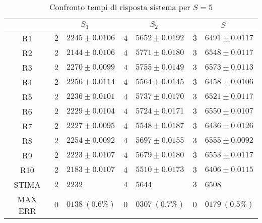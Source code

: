 \begin{table}[!h]
\begin{tabular}{c|r@{.}l|r@{.}l|r@{.}l}
& \multicolumn{2}{|c|}{$S_1$}
& \multicolumn{2}{|c|}{$S_2$}
& \multicolumn{2}{|c}{$S$} 
\\          
\hline
R1      & $2$&$2245 \pm 0.0106$ & $4$&$5652 \pm 0.0192$ & $3$&$6491 \pm 0.0117$ \\
R2      & $2$&$2144 \pm 0.0106$ & $4$&$5771 \pm 0.0180$ & $3$&$6548 \pm 0.0117$ \\
R3      & $2$&$2270 \pm 0.0099$ & $4$&$5755 \pm 0.0149$ & $3$&$6573 \pm 0.0113$ \\
R4      & $2$&$2256 \pm 0.0114$ & $4$&$5564 \pm 0.0145$ & $3$&$6458 \pm 0.0106$ \\
R5      & $2$&$2236 \pm 0.0101$ & $4$&$5737 \pm 0.0170$ & $3$&$6521 \pm 0.0117$ \\
R6      & $2$&$2229 \pm 0.0104$ & $4$&$5724 \pm 0.0171$ & $3$&$6550 \pm 0.0107$ \\
R7      & $2$&$2227 \pm 0.0095$ & $4$&$5548 \pm 0.0187$ & $3$&$6436 \pm 0.0126$ \\
R8      & $2$&$2254 \pm 0.0092$ & $4$&$5697 \pm 0.0155$ & $3$&$6555 \pm 0.0092$ \\
R9      & $2$&$2223 \pm 0.0107$ & $4$&$5679 \pm 0.0180$ & $3$&$6553 \pm 0.0117$ \\
R10     & $2$&$2183 \pm 0.0107$ & $4$&$5510 \pm 0.0173$ & $3$&$6406 \pm 0.0115$ \\
STIMA   & $2$&$2232$            & $4$&$5644$            & $3$&$6508$            \\
MAX ERR & $0$&$0138 \ (0.6\%)$  & $0$&$0307 \ (0.7\%)$  & $0$&$0179 \ (0.5\%)$    
\end{tabular}
\centering
\caption{Confronto tempi di risposta sistema per $S=5$}
\label{tab:5_s}
\end{table}

